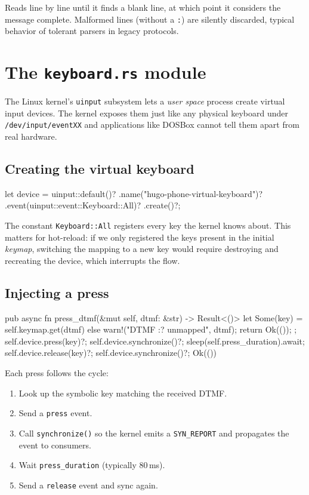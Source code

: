 Reads line by line until it finds a blank line, at which point it considers the message complete. Malformed lines (without a \texttt{:}) are silently discarded, typical behavior of tolerant parsers in legacy protocols.

\section{The \texttt{keyboard.rs} module}

The Linux kernel's \texttt{uinput} subsystem lets a \emph{user space} process create virtual input devices. The kernel exposes them just like any physical keyboard under \texttt{/dev/input/eventXX} and applications like DOSBox cannot tell them apart from real hardware.

\subsection{Creating the virtual keyboard}

\begin{rustcode}
let device = uinput::default()?
    .name("hugo-phone-virtual-keyboard")?
    .event(uinput::event::Keyboard::All)?
    .create()?;
\end{rustcode}

The constant \texttt{Keyboard::All} registers every key the kernel knows about. This matters for hot-reload: if we only registered the keys present in the initial \emph{keymap}, switching the mapping to a new key would require destroying and recreating the device, which interrupts the flow.

\subsection{Injecting a press}

\begin{rustcode}
pub async fn press_dtmf(&mut self, dtmf: &str) -> Result<()> {
    let Some(key) = self.keymap.get(dtmf) else {
        warn!("DTMF {:?} unmapped", dtmf);
        return Ok(());
    };
    self.device.press(key)?;
    self.device.synchronize()?;
    sleep(self.press_duration).await;
    self.device.release(key)?;
    self.device.synchronize()?;
    Ok(())
}
\end{rustcode}

Each press follows the cycle:

\begin{enumerate}
  \item Look up the symbolic key matching the received DTMF.
  \item Send a \texttt{press} event.
  \item Call \texttt{synchronize()} so the kernel emits a \texttt{SYN\_REPORT} and propagates the event to consumers.
  \item Wait \texttt{press\_duration} (typically 80\,ms).
  \item Send a \texttt{release} event and sync again.
\end{enumerate}

